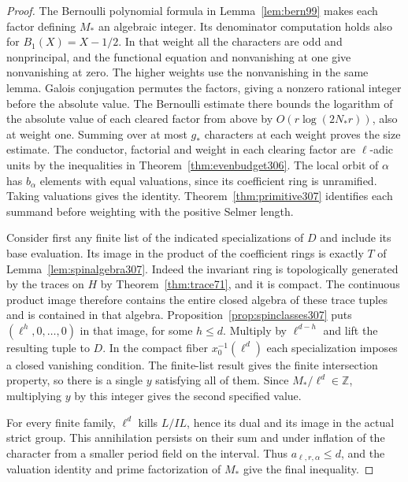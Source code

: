\documentclass[a4paper,11pt]{article}
\theoremstyle{definition}
\theoremstyle{remark}
\newcommand{\ZZ}{\mathbb Z}\newcommand{\ord}{\operatorname{ord}}
\numberwithin{equation}{section}
\begin{document}
\begin{proof}
The Bernoulli polynomial formula in Lemma~\ref{lem:bern99}
makes each factor defining \(M_*\) an algebraic integer. Its denominator computation holds also for
\(B_1(X)=X-1/2\). In that weight all the characters are odd
and nonprincipal, and the functional equation and nonvanishing
at one give nonvanishing at zero. The higher weights use the
nonvanishing in the same lemma. Galois conjugation permutes
the factors, giving a nonzero rational integer before the
absolute value. The Bernoulli estimate there bounds the
logarithm of the absolute value of each cleared factor from
above by \(O(r\log(2N_*r))\), also at weight one. Summing
over at most \(g_*\) characters at each weight proves the
size estimate. The conductor, factorial and weight in each
clearing factor are \(\ell\)-adic units by the inequalities
in Theorem~\ref{thm:evenbudget306}. The local orbit of
\(\alpha\) has \(b_\alpha\) elements with equal valuations,
since its coefficient ring is unramified. Taking valuations
gives the identity. Theorem~\ref{thm:primitive307} identifies
each summand before weighting with the positive Selmer length.

Consider first any finite list of the indicated specializations
of \(D\) and include its base evaluation. Its image in the
product of the coefficient rings is exactly \(T\) of
Lemma~\ref{lem:spinalgebra307}. Indeed the invariant ring is
topologically generated by the traces on \(H\) by
Theorem~\ref{thm:trace71}, and it is compact. The continuous
product image therefore contains the entire closed algebra of
these trace tuples and is contained in that algebra.
Proposition~\ref{prop:spinclasses307} puts
\((\ell^h,0,\ldots,0)\) in that image, for some \(h\le d\).
Multiply by \(\ell^{d-h}\) and lift the resulting tuple to
\(D\). In the compact fiber \(x_0^{-1}(\ell^d)\) each
specialization imposes a closed vanishing condition. The
finite-list result gives the finite intersection property,
so there is a single \(y\) satisfying all of them.
Since \(M_*/\ell^d\in\ZZ\), multiplying \(y\) by this
integer gives the second specified value.

For every finite family, \(\ell^d\) kills \(L/IL\), hence
its dual and its image in the actual strict group. This
annihilation persists on their sum and under inflation of
the character from a smaller period field on the interval.
Thus \(a_{\ell,r,\alpha}\le d\), and the valuation identity
and prime factorization of \(M_*\) give the final inequality.
\end{proof}
\end{document}
